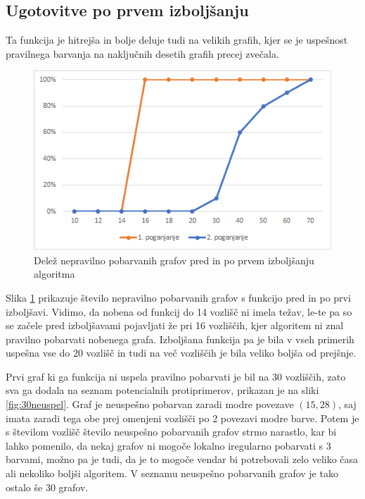 \documentclass[12pt, a4paper]{article}
\begin{document}
\subsection{Ugotovitve po prvem izboljšanju}

Ta funkcija je hitrejša in bolje deluje tudi na velikih grafih, kjer se je uspešnost pravilnega barvanja na naključnih desetih grafih precej zvečala.

\begin{figure}[H]
  \includegraphics[width=\linewidth]{stevilo_nepravilnih.png}
  \caption{Delež nepravilno pobarvanih grafov pred in po prvem izboljšanju algoritma}
  \label{fig:stnepravilnih1}
\end{figure}

Slika \ref{fig:stnepravilnih1} prikazuje število nepravilno pobarvanih grafov s funkcijo pred in po prvi izboljšavi. Vidimo, da nobena od funkcij do 14 vozlišč ni imela težav, le-te pa so se začele pred izboljšavami pojavljati že pri 16 vozliščih, kjer algoritem ni znal pravilno pobarvati nobenega grafa. Izboljšana funkcija pa je bila v vseh primerih uspešna vse do 20 vozlišč in tudi na več vozliščih je bila veliko boljša od prejšnje.

Prvi graf ki ga funkcija ni uspela pravilno pobarvati je bil na 30 vozliščih, zato sva ga dodala na seznam potencialnih protiprimerov, prikazan je na sliki \ref{fig:30neuspel}. Graf je neuspešno pobarvan zaradi modre povezave $(15, 28)$, saj imata zaradi tega obe prej omenjeni vozlišči po 2 povezavi modre barve. Potem je s številom vozlišč  število neuspešno pobarvanih grafov strmo narastlo, kar bi lahko pomenilo, da nekaj grafov ni mogoče lokalno iregularno pobarvati s 3 barvami, možno pa je tudi, da je to mogoče vendar bi potrebovali zelo veliko časa ali nekoliko boljši algoritem. V seznamu neuspešno pobarvanih grafov je tako ostalo še 30 grafov.
\end{document}
